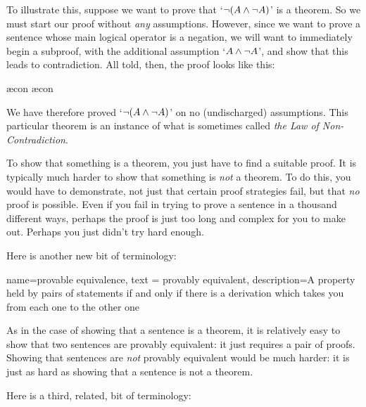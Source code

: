         To illustrate this, suppose we want to prove that `$\neg (A \mathbin{\wedge} \neg A)$' is a theorem. So we must start our proof without \emph{any} assumptions. However, since we want to prove a sentence whose main logical operator is a negation, we will want to  immediately begin a subproof, with the additional assumption `$A \mathbin{\wedge} \neg A$', and show that this leads to contradiction. All told, then, the proof looks like this:
	\begin{pf}
		\open
			\ae{con}
			\ae{con}
		\close
	\end{pf}
We have therefore proved `$\neg (A \mathbin{\wedge} \neg A)$' on no (undischarged) assumptions. This particular theorem is an instance of what is sometimes called \emph{the Law of Non-Contradiction}.

To show that something is a theorem, you just have to find a suitable proof. It is typically much harder to show that something is \emph{not} a theorem. To do this, you would have to demonstrate, not just that certain proof strategies fail, but that \emph{no} proof is possible. Even if you fail in trying to prove a sentence in a thousand different ways, perhaps the proof is just too long and complex for you to make out. Perhaps you just didn't try hard enough.

Here is another new bit of terminology:

{
  name=provable equivalence,
  text = provably equivalent,
description={A property held by pairs of statements if and only if there is a derivation which takes you from each one to the other one}
}


As in the case of showing that a sentence is a theorem, it is relatively easy to show that two sentences are provably equivalent: it just requires a pair of proofs. Showing that sentences are \emph{not} provably equivalent would be much harder: it is just as hard as showing that a sentence is not a theorem.

Here is a third, related, bit of terminology:

